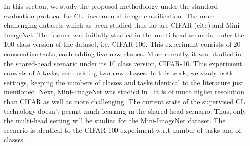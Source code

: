 \documentclass[colorinlistoftodos]{article} %
\begin{document}
In this section, we study the proposed methodology under the standard evaluation protocol for CL: incremental image classification. The more challenging datasets which as been studied thus far are CIFAR (cite) and Mini-ImageNet. The former was initially studied  in the multi-head scenario under the 100 class version of the dataset, i.e. CIFAR-100. This experiment consists of 20 consecutive tasks, each adding five new classes. More recently, it was studied in the shared-head scenario under its 10 class version, CIFAR-10. This experiment consists of 5 tasks, each adding two new classes. In this work, we study both settings, keeping the numbers of classes and tasks identical to the literature just mentioned. Next, Mini-ImageNet was studied in . It is of much higher resolution than CIFAR as well as more challenging. The current state of the supervised CL technology doesn't permit much learning in the shared-head scenario. Thus, only the multi-head setting will be studied for the Mini-ImageNet dataset. The scenario is identical to the CIFAR-100 experiment w.r.t number of tasks and of classes. 

\end{document}
